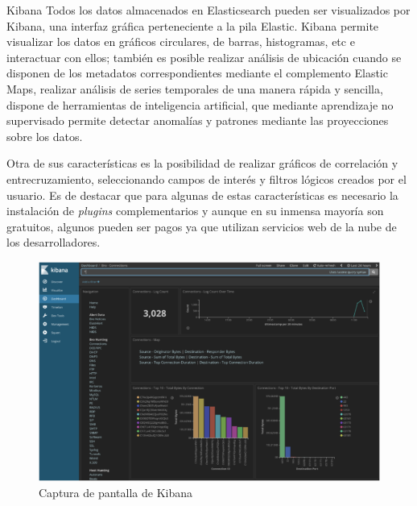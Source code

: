     \begin{subsection}{Kibana}
     Todos los datos almacenados en Elasticsearch pueden ser visualizados por Kibana, una interfaz gráfica perteneciente a la pila Elastic. Kibana permite visualizar los datos en gráficos circulares, de barras, histogramas, etc e interactuar con ellos; también es posible realizar análisis de ubicación cuando se disponen de los metadatos correspondientes mediante el complemento Elastic Maps, realizar análisis de series temporales de una manera rápida y sencilla, dispone de herramientas de inteligencia artificial, que mediante aprendizaje no supervisado permite detectar anomalías y patrones mediante las proyecciones sobre los datos. \par
     Otra de sus características es  la posibilidad de realizar gráficos de correlación y entrecruzamiento, seleccionando campos de interés y filtros lógicos creados por el usuario. Es de destacar que para algunas de estas características es necesario la instalación de \textit{plugins} complementarios y aunque en su inmensa mayoría son gratuitos, algunos pueden ser pagos ya que utilizan servicios web de la nube de los desarrolladores. 
     \begin{figure}[H]
        \centering
        \includegraphics[width=1\textwidth]{./descripcion_sonion_imagenes/figura_22_capt_kibana.png}
        \caption{Captura de pantalla de Kibana\cite{elastic}}
        \label{fig:captura_kibana}
        \end{figure}
   \end{subsection}
